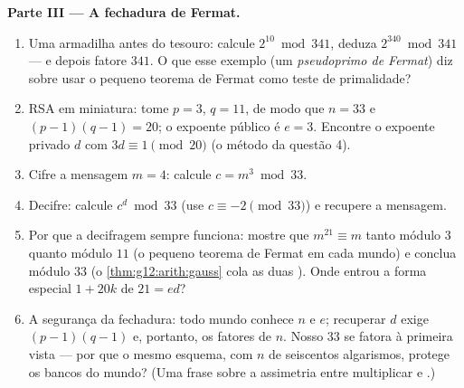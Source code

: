 \begin{problem}
\medskip
\noindent\textbf{Parte III --- A fechadura de Fermat.}
\begin{enumerate}[resume]
  \item Uma armadilha antes do tesouro: calcule
        $2^{10} \bmod 341$, deduza $2^{340} \bmod 341$ --- e
        depois fatore $341$. O que esse exemplo (um
        \emph{pseudoprimo de Fermat}) diz sobre usar o pequeno
        teorema de Fermat como teste de primalidade?
  \item RSA em miniatura: tome $p = 3$, $q = 11$, de modo que
        $n = 33$ e $(p-1)(q-1) = 20$; o expoente público é
        $e = 3$. Encontre o expoente privado $d$ com
        $3d \equiv 1 \pmod{20}$ (o método da questão 4).
  \item Cifre a mensagem $m = 4$: calcule
        $c = m^3 \bmod 33$.
  \item Decifre: calcule $c^d \bmod 33$ (use
        $c \equiv -2 \pmod{33}$) e recupere a mensagem.
  \item Por que a decifragem sempre funciona: mostre que
        $m^{21} \equiv m$ tanto módulo $3$ quanto módulo $11$ (o
        pequeno teorema de Fermat em cada mundo) e conclua módulo
        $33$ (o \cref{thm:g12:arith:gauss} cola as duas
        ). Onde entrou a forma especial
        $1 + 20k$ de $21 = ed$?
  \item A segurança da fechadura: todo mundo conhece $n$ e $e$;
        recuperar $d$ exige $(p-1)(q-1)$ e, portanto, os fatores
        de $n$. Nosso $33$ se fatora à primeira vista --- por que
        o mesmo esquema, com $n$ de seiscentos algarismos,
        protege os bancos do mundo? (Uma frase sobre a assimetria
        entre multiplicar e .)
\end{enumerate}


\end{problem}
